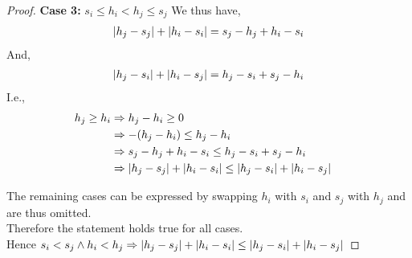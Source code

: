\documentclass[12pt]{article}
\newenvironment{question}[2][Question]{\begin{trivlist}
\item[\hskip \labelsep {\bfseries #1}\hskip \labelsep {\bfseries #2.}]}{\end{trivlist}}
\DeclarePairedDelimiter\abs{\lvert}{\rvert}%
\begin{document}
\begin{question}{2 (a)}
\begin{proof}
    \textbf{Case 3:} $s_{i} \leq h_{i} < h_{j} \leq s_{j}$
    We thus have,
    \begin{align*}
      \abs{h_{j} - s_{j}} + \abs{h_{i} - s_{i}} = s_{j} - h_{j} + h_{i} - s_{i}
    \end{align*}
    And,
    \begin{align*}
      \abs{h_{j} - s_{i}} + \abs{h_{i} - s_{j}} = h_{j} - s_{i} + s_{j} - h_{i}
    \end{align*}
    I.e.,
    \begin{align*}
      h_{j} \geq h_{i} & \Rightarrow h_{j} - h_{i} \geq 0 & \\
                       & \Rightarrow -(h_{j} - h_{i}) \leq h_{j} - h_{i} & \\
                       & \Rightarrow s_{j} - h_{j} + h_{i} - s_{i} \leq h_{j} - s_{i} + s_{j} - h_{i} &\\
                       & \Rightarrow \abs{h_{j} - s_{j}} + \abs{h_{i} - s_{i}} \leq \abs{h_{j} - s_{i}} + \abs{h_{i} - s_{j}} & \\
    \end{align*}

    The remaining cases can be expressed by swapping $h_{i}$ with
    $s_{i}$ and $s_{j}$ with $h_{j}$ and are thus omitted.\\ 
    Therefore the statement holds true for all cases.\\
    Hence $s_{i} < s_{j} \land h_{i} < h_{j} \Rightarrow \abs{h_{j} - s_{j}} + \abs{h_{i} - s_{i}} \leq \abs{h_{j} - s_{i}} + \abs{h_{i} - s_{j}}$ 
  \end{proof}
\end{question}
\end{document}
